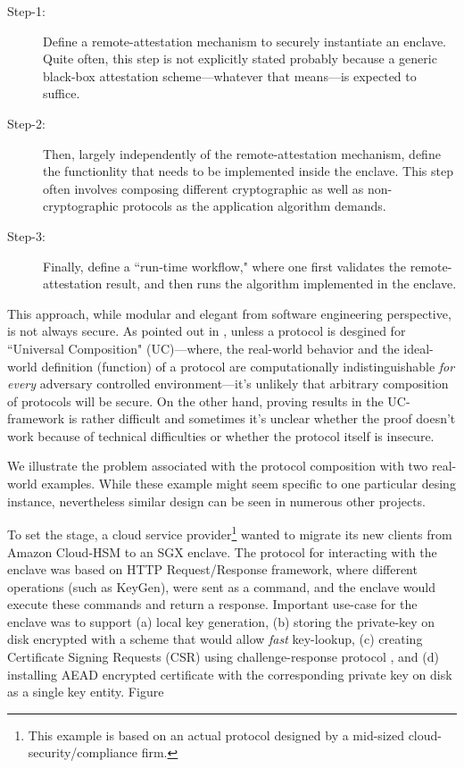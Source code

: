 \documentclass[10pt]{article}
\newcommand{\uc}{\textsf{UC}}
\begin{document}
  \begin{description}
    \item[Step-1:] Define a remote-attestation mechanism to securely 
      instantiate an enclave. Quite often, this step is not explicitly 
      stated probably because a generic black-box attestation 
      scheme---whatever that means---is expected to suffice.
    \item[Step-2:] Then, largely independently of the remote-attestation 
      mechanism, define the functionlity that needs to be implemented 
      inside the enclave. This step often involves composing different 
      cryptographic as well as non-cryptographic protocols as the 
      application algorithm demands.
    \item[Step-3:] Finally, define a ``run-time workflow," where one first
      validates the remote-attestation result, and then runs the algorithm
      implemented in the enclave.
  \end{description}

  This approach, while modular and elegant from software engineering
  perspective, is not always secure. As pointed out in 
  \cite{ucframework}, unless a protocol is desgined for 
  ``\textsf{Universal Composition}" (\uc)---where, the real-world 
  behavior and the ideal-world definition (function) of a protocol 
  are computationally indistinguishable \textit{for every} adversary 
  controlled environment---it's unlikely that arbitrary composition 
  of protocols will be secure. On the other hand, proving results in 
  the \uc-framework is rather difficult and sometimes it's unclear 
  whether the proof doesn't work because of technical difficulties 
  or whether the protocol itself is insecure.

  We illustrate the problem associated with the protocol composition 
  with two real-world examples. While these example might seem specific 
  to one particular desing instance, nevertheless similar design can be
  seen in numerous other projects.

  To set the stage, a cloud service provider\footnote{This example is 
  based on an actual protocol designed by a mid-sized 
  cloud-security/compliance firm.} wanted to migrate its new clients 
  from Amazon Cloud-HSM to an SGX enclave. The protocol for interacting 
  with the enclave was based on HTTP Request/Response framework, where 
  different operations (such as \textsf{KeyGen}), were sent as a 
  command, and the enclave would execute these commands and return a 
  response. Important use-case for the enclave was to support (a) 
  local key generation, (b) storing the private-key on disk encrypted 
  with a scheme that would allow \textit{fast} key-lookup, (c) creating 
  Certificate Signing Requests (CSR) using challenge-response protocol 
  \cite[\S5.2.8.3]{rfc4210}, and (d) installing AEAD encrypted certificate 
  with the corresponding private key on disk as a single key entity. Figure~\
\end{document}
